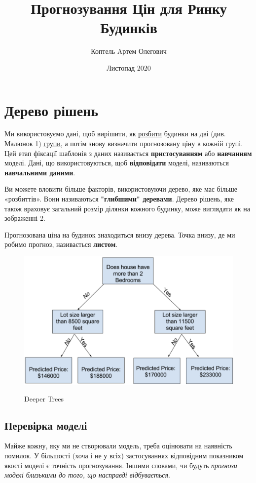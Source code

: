 \documentclass[11pt]{article}
\title{Прогнозування Цін для Ринку Будинків}
\author{Коптель Aртем Олегович}
\date{Листопад 2020}
\begin{document}
    \section{Дерево рішень}\label{sec:decision_tree}
    Ми використовуємо дані, щоб вирішити, як \underline{розбити} будинки на дві (див. Малюнок 1) \underline{групи}, а потім знову визначити прогнозовану ціну в кожній групі.
    Цей етап фіксації шаблонів з даних називається \textbf{пристосуванням} або \textbf{навчанням} моделі.
    Дані, що використовуються, щоб \textbf{відповідати} моделі, називаються \textbf{навчальними даними}.

    Ви можете вловити більше факторів, використовуючи дерево, яке має більше «розбиттів».
    Вони називаються \textbf{"глибшими" деревами}.
    Дерево рішень, яке також враховує загальний розмір ділянки кожного будинку, може виглядати як на зображенні 2.

    Прогнозована ціна на будинок знаходиться внизу дерева.
    Точка внизу, де ми робимо прогноз, називається \textbf{листом}.

    \begin{figure}
        \label{fig:image2}
        \centering
        \includegraphics[scale=0.5]{image2.png}

        Deeper Trees
    \end{figure}

    \subsection{Перевірка моделі}\label{subsec:model_validation}
    Майже кожну, яку ми не створювали модель, треба оцінювати на наявність помилок.
    У більшості (хоча і не у всіх) застосуваннях відповідним показником якості моделі є точність прогнозування.
    Іншими словами, чи будуть \textit{прогнози моделі близькими до того, що насправді відбувається}.
\end{document}
